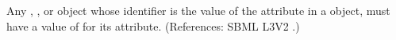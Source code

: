 Any \Compartment, \Species, \Parameter or \SpeciesReference object whose
identifier is the value of the attribute  in a \RateRule
object, must have a value of  for its 
attribute.  (References: SBML L3V2 .)
